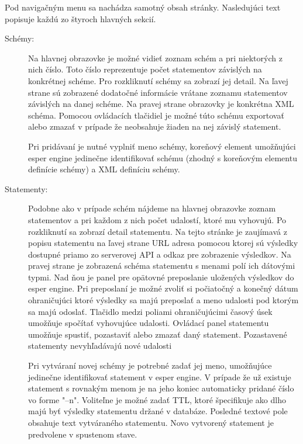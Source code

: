 	
	Pod navigačným menu sa nachádza samotný obsah stránky. Nasledujúci text popisuje každú zo štyroch hlavných sekcií.
	\begin{description}
		\item[Schémy:] Na hlavnej obrazovke je možné vidieť zoznam schém a pri niektorých z nich číslo. Toto číslo reprezentuje počet statementov závislých na konkrétnej schéme. Pro rozkliknutí schémy sa zobrazí jej detail. Na ľavej strane sú zobrazené dodatočné informácie vrátane zoznamu statementov závislých na danej schéme. Na pravej strane obrazovky je konkrétna XML schéma. Pomocou ovládacích tlačidiel je možné túto schému exportovať alebo zmazať v prípade že neobsahuje žiaden na nej závislý statement.

		Pri pridávaní je nutné vyplniť meno schémy, koreňový element umožňujúci esper engine jedinečne identifikovať schému (zhodný s koreňovým elementu definície schémy) a XML definíciu schémy.

		\item[Statementy:] Podobne ako v prípade schém nájdeme na hlavnej obrazovke zoznam statementov a pri každom z nich počet udalostí, ktoré mu vyhovujú. Po rozkliknutí sa zobrazí detail statementu. Na tejto stránke je zaujímavá z popisu statementu na ľavej strane URL adresa pomocou ktorej sú výsledky dostupné priamo zo serverovej API a odkaz pre zobrazenie výsledkov.
		Na pravej strane je zobrazená schéma statementu s menami polí ich dátovými typmi. Nad ňou je panel pre opätovné preposlanie uložených výsledkov do esper engine. Pri preposlaní je možné zvoliť si počiatočný a konečný dátum ohraničujúci ktoré výsledky sa majú preposlať a meno udalosti pod ktorým sa majú odoslať. Tlačidlo medzi poliami ohraničujúcimi časový úsek umožňuje spočítať vyhovujúce udalosti.
		Ovládací panel statementu umožňuje spustiť, pozastaviť alebo zmazať daný statement. Pozastavené statementy nevyhľadávajú nové udalosti
		
		Pri vytváraní novej schémy je potrebné zadať jej meno, umožňujúce jedinečne identifikovať statement v esper engine. V prípade že už existuje statement s rovnakým menom je na jeho koniec automaticky pridané číslo vo forme "--n". Voliteľne je možné zadať TTL, ktoré špecifikuje ako dlho majú byť výsledky statementu držané v databáze. Posledné textové pole obsahuje text vytváraného statementu. Novo vytvorený statement je predvolene v spustenom stave.
		

\end{description}
